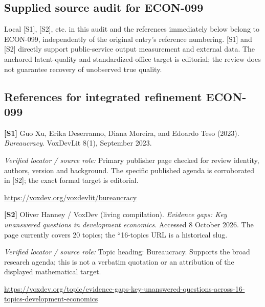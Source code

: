 \documentclass[11pt,a4paper]{article}
\begin{document}
\subsection*{Supplied source audit for ECON-099}
Local [S1], [S2], etc. in this audit and the references immediately below
belong to ECON-099, independently of the original entry's reference numbering.
[S1] and [S2] directly support public-service output measurement and external data. The anchored latent-quality and standardized-office target is editorial; the review does not guarantee recovery of unobserved true quality.
\subsection*{References for integrated refinement ECON-099}
{\footnotesize\raggedright
\par\noindent\textbf{[S1]} Guo Xu, Erika Deserranno, Diana Moreira, and Edoardo Teso (2023). \emph{Bureaucracy}. VoxDevLit 8(1), September 2023.\par \textit{Verified locator / source role:} Primary publisher page checked for review identity, authors, version and background. The specific published agenda is corroborated in [S2]; the exact formal target is editorial.\par \url{https://voxdev.org/voxdevlit/bureaucracy}\par\smallskip
\par\noindent\textbf{[S2]} Oliver Hanney / VoxDev (living compilation). \emph{Evidence gaps: Key unanswered questions in development economics}. Accessed 8 October 2026. The page currently covers 20 topics; the ``16-topics URL is a historical slug.\par \textit{Verified locator / source role:} Topic heading: Bureaucracy. Supports the broad research agenda; this is not a verbatim quotation or an attribution of the displayed mathematical target.\par \url{https://voxdev.org/topic/evidence-gaps-key-unanswered-questions-across-16-topics-development-economics}\par\smallskip
}
\end{document}
